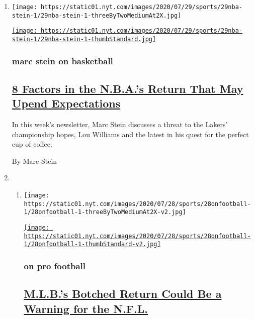 \begin{enumerate}
\def\labelenumi{\arabic{enumi}.}
\item
  \texttt{[image: https://static01.nyt.com/images/2020/07/29/sports/29nba-stein-1/29nba-stein-1-threeByTwoMediumAt2X.jpg]}

  \href{/2020/07/29/sports/basketball/nba-restart-lou-williams.html}{\texttt{[image: https://static01.nyt.com/images/2020/07/29/sports/29nba-stein-1/29nba-stein-1-thumbStandard.jpg]}}

  \hypertarget{marc-stein-on-basketball}{%
  \subsubsection{marc stein on
  basketball}\label{marc-stein-on-basketball}}

  \hypertarget{8-factors-in-the-nbas-return-that-may-upend-expectations}{%
  \subsection{\texorpdfstring{\href{/2020/07/29/sports/basketball/nba-restart-lou-williams.html}{8
  Factors in the N.B.A.'s Return That May Upend
  Expectations}}{8 Factors in the N.B.A.'s Return That May Upend Expectations}}\label{8-factors-in-the-nbas-return-that-may-upend-expectations}}

  In this week's newsletter, Marc Stein discusses a threat to the
  Lakers' championship hopes, Lou Williams and the latest in his quest
  for the perfect cup of coffee.

  By Marc Stein
\item
  \begin{enumerate}
  \def\labelenumii{\arabic{enumii}.}
  \item
    \texttt{[image: https://static01.nyt.com/images/2020/07/28/sports/28onfootball-1/28onfootball-1-threeByTwoMediumAt2X-v2.jpg]}

    \href{/2020/07/29/sports/football/nfl-mlb-opting-out.html}{\texttt{[image: https://static01.nyt.com/images/2020/07/28/sports/28onfootball-1/28onfootball-1-thumbStandard-v2.jpg]}}

    \hypertarget{on-pro-football}{%
    \subsubsection{on pro football}\label{on-pro-football}}

    \hypertarget{mlbs-botched-return-could-be-a-warning-for-the-nfl}{%
    \subsection{\texorpdfstring{\href{/2020/07/29/sports/football/nfl-mlb-opting-out.html}{M.L.B.'s
    Botched Return Could Be a Warning for the
    N.F.L.}}{M.L.B.'s Botched Return Could Be a Warning for the N.F.L.}}\label{mlbs-botched-return-could-be-a-warning-for-the-nfl}}


\end{enumerate}
\end{enumerate}

